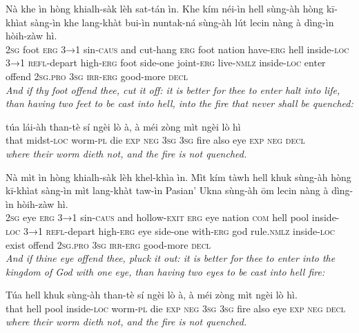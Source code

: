 \documentclass[11pt,a4paper]{article}
\begin{document}
\begin{exe}
\gll Nà khe ìn hòng khialh-sàk lèh sat-tán ìn. Khe kím néi-ìn hell sùng-àh hòng kī-khìat sàng-ìn khe lang-khàt bui-ìn nuntak-ná sùng-àh lút lecin nàng à dìng-ìn hòih-zàw hì. \\
     \textsc{2sg} foot \textsc{erg} \textsc{3→1} sin-\textsc{caus} and cut-hang \textsc{erg} foot nation have-\textsc{erg} hell inside-\textsc{loc} \textsc{3→1} \textsc{refl}-depart high-\textsc{erg} foot side-one joint-\textsc{erg} live-\textsc{nmlz} inside-\textsc{loc} enter offend \textsc{2sg}.\textsc{pro} \textsc{3sg} \textsc{irr}-\textsc{erg} good-more \textsc{decl} \\
\glt \textcolor{kjvcolor}{\textit{And if thy foot offend thee, cut it off: it is better for thee to enter halt into life, than having two feet to be cast into hell, into the fire that never shall be quenched:}}

\gll túa lái-àh than-tè sí ngèi lò à, à méi zòng mìt ngèi lò hì \\
     that midst-\textsc{loc} worm-\textsc{pl} die \textsc{exp} \textsc{neg} \textsc{3sg} \textsc{3sg} fire also eye \textsc{exp} \textsc{neg} \textsc{decl} \\
\glt \textcolor{kjvcolor}{\textit{where their worm dieth not, and the fire is not quenched.}}

\gll Nà mìt ìn hòng khialh-sàk lèh khel-khìa ìn. Mìt kím tàwh hell khuk sùng-àh hòng kī-khìat sàng-ìn mìt lang-khàt taw-ìn Pasian' Ukna sùng-àh ōm lecin nàng à dìng-ìn hòih-zàw hì. \\
     \textsc{2sg} eye \textsc{erg} \textsc{3→1} sin-\textsc{caus} and hollow-\textsc{exit} \textsc{erg} eye nation \textsc{com} hell pool inside-\textsc{loc} \textsc{3→1} \textsc{refl}-depart high-\textsc{erg} eye side-one with-\textsc{erg} god rule.\textsc{nmlz} inside-\textsc{loc} exist offend \textsc{2sg}.\textsc{pro} \textsc{3sg} \textsc{irr}-\textsc{erg} good-more \textsc{decl} \\
\glt \textcolor{kjvcolor}{\textit{And if thine eye offend thee, pluck it out: it is better for thee to enter into the kingdom of God with one eye, than having two eyes to be cast into hell fire:}}

\gll Túa hell khuk sùng-àh than-tè sí ngèi lò à, à méi zòng mìt ngèi lò hì. \\
     that hell pool inside-\textsc{loc} worm-\textsc{pl} die \textsc{exp} \textsc{neg} \textsc{3sg} \textsc{3sg} fire also eye \textsc{exp} \textsc{neg} \textsc{decl} \\
\glt \textcolor{kjvcolor}{\textit{where their worm dieth not, and the fire is not quenched.}}


\end{exe}
\end{document}
